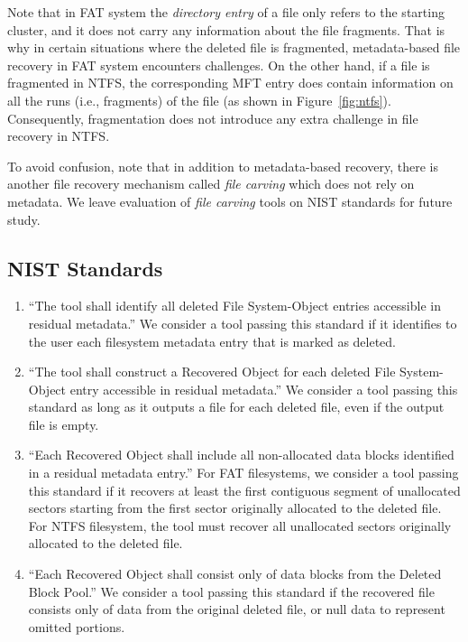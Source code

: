 Note that in FAT system the \emph{directory entry} of a file only refers to the starting cluster, and it does not carry any information about the file fragments.
That is why in certain situations where the deleted file is fragmented, metadata-based file recovery in FAT system encounters challenges.
On the other hand, if a file is fragmented in NTFS, the corresponding MFT entry does contain information on all the runs (i.e., fragments) of the file
(as shown in Figure~\ref{fig:ntfs}). Consequently, fragmentation does not introduce any extra challenge in file recovery in NTFS.

To avoid confusion, note that in addition to metadata-based recovery, there is another file recovery mechanism called \emph{file carving} which does not  
rely on metadata. We leave evaluation of \emph{file carving} tools on NIST standards for future study. 

\subsection{NIST Standards}
\begin{enumerate}
 \item ``The tool shall identify all deleted File System-Object entries accessible in residual metadata.''\cite{meta:dfr:standards}
 We consider a tool passing this standard if it identifies to the user each filesystem metadata entry that is marked as deleted.
 \item ``The tool shall construct a Recovered Object for each deleted File System-Object entry accessible in residual metadata.''\cite{meta:dfr:standards}
 We consider a tool passing this standard as long as it outputs a file for each deleted file, even if the output file is empty.
 \item ``Each Recovered Object shall include all non-allocated data blocks identified in a residual metadata entry.''\cite{meta:dfr:standards}
 For FAT filesystems, we consider a tool passing this standard if it recovers at least the first contiguous segment of unallocated sectors starting from the first sector originally allocated to the deleted file. For NTFS filesystem, the tool must recover all unallocated sectors originally allocated to the deleted file.
 \item ``Each Recovered Object shall consist only of data blocks from the Deleted Block Pool.''\cite{meta:dfr:standards}
 We consider a tool passing this standard if the recovered file consists only of data from the original deleted file, or null data to represent omitted portions.
\end{enumerate}


